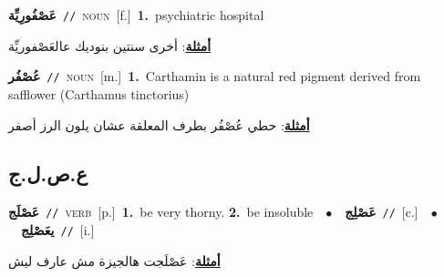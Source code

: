 \documentclass[10pt,a4paper,twoside]{article} %
\begin{document}
\begin{multicols}{2}
{\setlength\topsep{0pt}\textbf{\foreignlanguage{arabic}{عَصْفُورِيِّة}}\ {\color{gray}\texttt{//}\color{black}}\ \textsc{noun}\ [f.]\ \textbf{1.}~psychiatric hospital\  \begin{flushright}\color{gray}\foreignlanguage{arabic}{\textbf{\underline{\foreignlanguage{arabic}{أمثلة}}}: أخرى سنتين بنوديك عالعَصْفوريِّة}\end{flushright}\color{black}} \vspace{2mm}

{\setlength\topsep{0pt}\textbf{\foreignlanguage{arabic}{عُصْفُر}}\ {\color{gray}\texttt{//}\color{black}}\ \textsc{noun}\ [m.]\ \textbf{1.}~Carthamin is a natural red pigment derived from safflower (Carthamus tinctorius)\  \begin{flushright}\color{gray}\foreignlanguage{arabic}{\textbf{\underline{\foreignlanguage{arabic}{أمثلة}}}: حطي عُصْفُر بطرف المعلقة عشان يلون الرز أصفر}\end{flushright}\color{black}} \vspace{2mm}

\vspace{-3mm}
\subsection*{\color{blue}\foreignlanguage{arabic}{ع.ص.ل.ج}\color{blue}{}} 

{\setlength\topsep{0pt}\textbf{\foreignlanguage{arabic}{عَصْلَج}}\ {\color{gray}\texttt{//}\color{black}}\ \textsc{verb}\ [p.]\ \textbf{1.}~be very thorny.  \textbf{2.}~be insoluble\ \ $\bullet$\ \ \setlength\topsep{0pt}\textbf{\foreignlanguage{arabic}{عَصْلِج}}\ {\color{gray}\texttt{//}\color{black}}\ [c.]\ \ $\bullet$\ \ \setlength\topsep{0pt}\textbf{\foreignlanguage{arabic}{يعَصْلِج}}\ {\color{gray}\texttt{//}\color{black}}\ [i.]\  \begin{flushright}\color{gray}\foreignlanguage{arabic}{\textbf{\underline{\foreignlanguage{arabic}{أمثلة}}}: عَصْلَجت هالجيزة مش عارف ليش}\end{flushright}\color{black}} \vspace{2mm}


\end{multicols}
\end{document}
